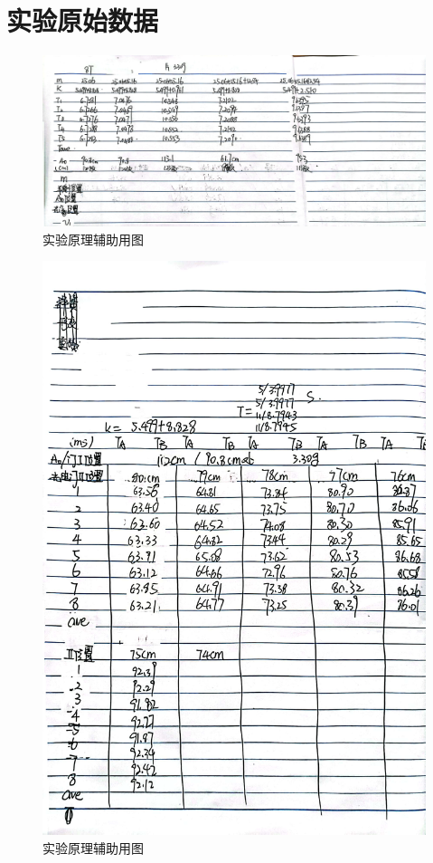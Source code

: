 \documentclass{ctexart}
\begin{document}
\section{实验原始数据}
\begin{figure}[h]
  \centering
  \includegraphics[width=1\textwidth]{yuanshishujv1.jpg}
  \caption{实验原理辅助用图}\label{yuanshishujv1}
\end{figure}
\newpage
\begin{figure}[h]
  \centering
  \includegraphics[height=1\textwidth,width=1\textwidth]{yuanshishujv2.jpg}
  \caption{实验原理辅助用图}\label{yuanshishujv2}
\end{figure}
\newpage
\end{document}
